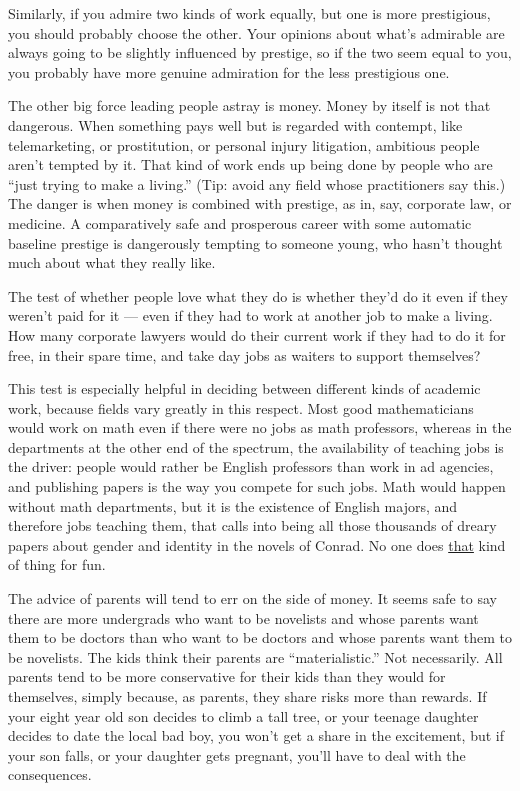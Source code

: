 Similarly, if you admire two kinds of work equally, but one is more
prestigious, you should probably choose the other. Your opinions about
what's admirable are always going to be slightly influenced by prestige,
so if the two seem equal to you, you probably have more genuine
admiration for the less prestigious one.

The other big force leading people astray is money. Money by itself is
not that dangerous. When something pays well but is regarded with
contempt, like telemarketing, or prostitution, or personal injury
litigation, ambitious people aren't tempted by it. That kind of work
ends up being done by people who are ``just trying to make a living.''
(Tip: avoid any field whose practitioners say this.) The danger is when
money is combined with prestige, as in, say, corporate law, or medicine.
A comparatively safe and prosperous career with some automatic baseline
prestige is dangerously tempting to someone young, who hasn't thought
much about what they really like.

The test of whether people love what they do is whether they'd do it
even if they weren't paid for it --- even if they had to work at another
job to make a living. How many corporate lawyers would do their current
work if they had to do it for free, in their spare time, and take day
jobs as waiters to support themselves?

This test is especially helpful in deciding between different kinds of
academic work, because fields vary greatly in this respect. Most good
mathematicians would work on math even if there were no jobs as math
professors, whereas in the departments at the other end of the spectrum,
the availability of teaching jobs is the driver: people would rather be
English professors than work in ad agencies, and publishing papers is
the way you compete for such jobs. Math would happen without math
departments, but it is the existence of English majors, and therefore
jobs teaching them, that calls into being all those thousands of dreary
papers about gender and identity in the novels of Conrad. No one does
\href{http://www.google.com/scholar?q=gender+identity+narrative+discourse+transcend}{that}
kind of thing for fun.

The advice of parents will tend to err on the side of money. It seems
safe to say there are more undergrads who want to be novelists and whose
parents want them to be doctors than who want to be doctors and whose
parents want them to be novelists. The kids think their parents are
``materialistic.'' Not necessarily. All parents tend to be more
conservative for their kids than they would for themselves, simply
because, as parents, they share risks more than rewards. If your eight
year old son decides to climb a tall tree, or your teenage daughter
decides to date the local bad boy, you won't get a share in the
excitement, but if your son falls, or your daughter gets pregnant,
you'll have to deal with the consequences.

